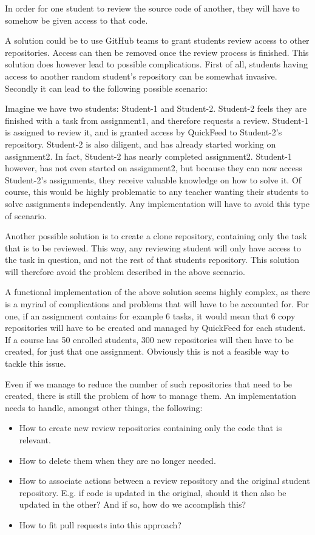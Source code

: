 In order for one student to review the source code of another, they will have to somehow be given access to that code.

A solution could be to use GitHub teams to grant students review access to other repositories.
Access can then be removed once the review process is finished.
This solution does however lead to possible complications.
First of all, students having access to another random student's repository can be somewhat invasive.
Secondly it can lead to the following possible scenario:

Imagine we have two students: Student-1 and Student-2.
Student-2 feels they are finished with a task from assignment1, and therefore requests a review.
Student-1 is assigned to review it, and is granted access by QuickFeed to Student-2's repository.
Student-2 is also diligent, and has already started working on assignment2.
In fact, Student-2 has nearly completed assignment2.
Student-1 however, has not even started on assignment2, but because they can now access Student-2's assignments, they receive valuable knowledge on how to solve it.
Of course, this would be highly problematic to any teacher wanting their students to solve assignments independently.
Any implementation will have to avoid this type of scenario.

Another possible solution is to create a clone repository, containing only the task that is to be reviewed. 
This way, any reviewing student will only have access to the task in question, and not the rest of that students repository.
This solution will therefore avoid the problem described in the above scenario.

A functional implementation of the above solution seems highly complex, as there is a myriad of complications and problems that will have to be accounted for.
For one, if an assignment contains for example 6 tasks, it would mean that 6 copy repositories will have to be created and managed by QuickFeed for each student.
If a course has 50 enrolled students, 300 new repositories will then have to be created, for just that one assignment.
Obviously this is not a feasible way to tackle this issue.

Even if we manage to reduce the number of such repositories that need to be created, there is still the problem of how to manage them.
An implementation needs to handle, amongst other things, the following:

\begin{itemize}
    \item How to create new review repositories containing only the code that is relevant.
    \item How to delete them when they are no longer needed.
    \item How to associate actions between a review repository and the original student repository.
          E.g. if code is updated in the original, should it then also be updated in the other?
          And if so, how do we accomplish this?
    \item How to fit pull requests into this approach?
\end{itemize}


